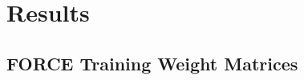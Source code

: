 \documentclass[11pt]{article} %
\begin{document}
%
%





\section*{Results} 

\subsection*{FORCE Training Weight Matrices} 
\end{document}
